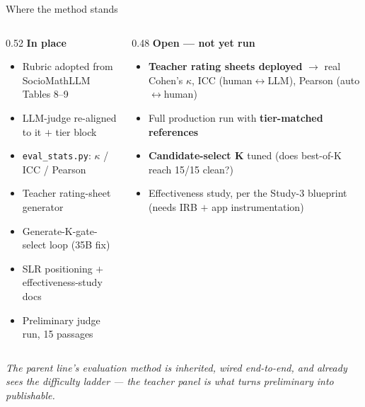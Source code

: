 \documentclass[aspectratio=169,10pt]{beamer}
\newcommand{\ok}{{\color{cApp}\textbf{\checkmark}}}
\begin{document}
\begin{frame}{Where the method stands}
\small
\begin{columns}[T]
\begin{column}{0.52\textwidth}
\textbf{\color{cApp}In place}
\begin{itemize}\setlength\itemsep{1pt}\small
  \item Rubric adopted from SocioMathLLM Tables 8--9 \ok
  \item LLM-judge re-aligned to it $+$ tier block \ok
  \item \texttt{eval\_stats.py}: $\kappa$ / ICC / Pearson \ok
  \item Teacher rating-sheet generator \ok
  \item Generate-K-gate-select loop (35B fix) \ok
  \item SLR positioning $+$ effectiveness-study docs \ok
  \item Preliminary judge run, 15 passages \ok
\end{itemize}
\end{column}
\begin{column}{0.48\textwidth}
\textbf{\color{cAccent}Open --- not yet run}
\begin{itemize}\setlength\itemsep{1pt}\small
  \item \textbf{Teacher rating sheets deployed} $\rightarrow$ real Cohen's $\kappa$, ICC
        (human$\leftrightarrow$LLM), Pearson (auto$\leftrightarrow$human)
  \item Full production run with \textbf{tier-matched references}
  \item \textbf{Candidate-select K} tuned (does best-of-K reach 15/15 clean?)
  \item Effectiveness study, per the Study-3 blueprint (needs IRB $+$ app instrumentation)
\end{itemize}
\end{column}
\end{columns}
\vspace{0.6em}
\begin{center}
{\footnotesize\itshape The parent line's evaluation method is inherited, wired end-to-end, and
already sees the difficulty ladder --- the teacher panel is what turns preliminary into publishable.}
\end{center}
\end{frame}
\end{document}
